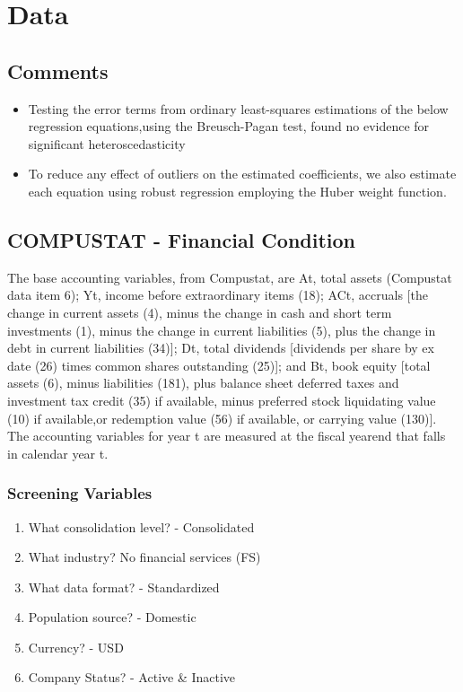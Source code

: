 \documentclass[12pt]{article}
\begin{document}
\section{Data}

    \subsection{Comments}

    \begin{itemize}
        \item Testing the error terms from ordinary least-squares estimations of the below regression equations,using the Breusch-Pagan test, found no evidence for significant heteroscedasticity \citep{Brigida2012}
        \item To reduce any effect of outliers on the estimated coefficients, we also estimate each equation using robust regression employing the Huber weight function. \citep{Brigida2012}
    \end{itemize}

    \subsection{COMPUSTAT - Financial Condition}
    The base accounting variables, from Compustat, are At, total assets (Compustat data
    item 6); Yt, income before extraordinary items (18); ACt, accruals [the change in current assets (4), minus the change in cash and short term investments (1), minus the change in
    current liabilities (5), plus the change in debt in current liabilities (34)]; Dt, total dividends [dividends per share by ex date (26) times common shares outstanding (25)]; and Bt, book equity  [total assets (6), minus liabilities (181), plus balance sheet deferred taxes and
    investment tax credit (35) if available, minus preferred stock liquidating value (10) if available,or redemption value (56) if available, or carrying value (130)]. The accounting variables for year t are measured at the fiscal yearend that falls in calendar year t. \citep{Fama2006}
        \subsubsection{Screening Variables}

        \begin{enumerate}
            \item What consolidation level? - Consolidated
            \item What industry? No financial services (FS) 
            \item What data format?  - Standardized 
            \item Population source? - Domestic 
            \item Currency? - USD 
            \item Company Status? - Active \& Inactive  
        \end{enumerate}
\end{document}
